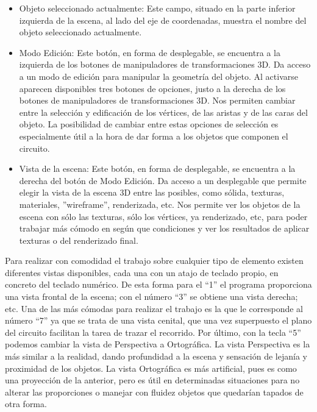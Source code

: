 \begin{itemize}
	\item Objeto seleccionado actualmente: Este campo, situado en la parte inferior izquierda de la escena, al lado del eje de coordenadas, muestra el  nombre del objeto seleccionado actualmente.
	
	\item Modo Edición: Este botón, en forma de desplegable, se encuentra a la izquierda de los botones de manipuladores de transformaciones 3D. Da acceso a un modo de edición para manipular la geometría del objeto. Al activarse aparecen disponibles tres botones de opciones, justo a la derecha de los botones de manipuladores de transformaciones 3D. Nos permiten cambiar entre la selección y edificación de los vértices, de las aristas y de las caras del objeto. La posibilidad de cambiar entre estas opciones de selección es especialmente útil a la hora de dar forma a los objetos que componen el circuito.
	
	\item Vista de la escena: Este botón, en forma de desplegable, se encuentra a la derecha del botón de Modo Edición. Da acceso a un desplegable que permite elegir la vista de la escena 3D entre las posibles, como sólida, texturas, materiales, ”wireframe”, renderizada, etc. Nos permite ver los objetos de la escena con sólo las texturas, sólo los vértices, ya renderizado, etc, para poder trabajar más cómodo en según que condiciones y ver los resultados de aplicar texturas o del renderizado final.
	
\end{itemize}

Para realizar con comodidad el trabajo sobre cualquier tipo de elemento existen diferentes vistas disponibles, cada una con un atajo de teclado propio, en concreto del teclado numérico. De esta forma para el “1” el programa proporciona una vista frontal de la escena; con el número “3” se obtiene una vista derecha; etc. Una de las más cómodas para realizar el trabajo es la que le corresponde al número “7” ya que se trata de una vista cenital, que una vez superpuesto el plano del circuito facilitan la tarea de trazar el recorrido. Por último, con la tecla “5” podemos cambiar la vista de Perspectiva a Ortográfica. La vista Perspectiva es la más similar a la realidad, dando profundidad a la escena y sensación de lejanía y proximidad de los objetos. La vista Ortográfica es más artificial, pues es como una proyección de la anterior, pero es útil en determinadas situaciones para no alterar las proporciones o manejar con fluidez objetos que quedarían tapados de otra forma.


